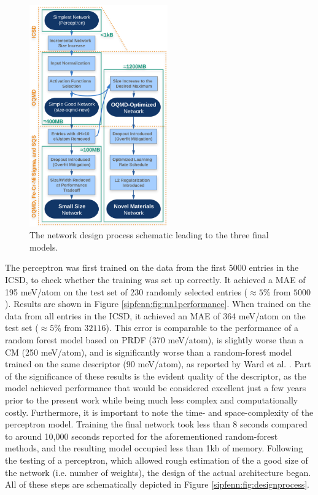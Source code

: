 \begin{figure}[H]
    \centering
    \includegraphics[width=0.53\textwidth]{sipfenn/SIPFENN_design_updated.png}
    \caption{The network design process schematic leading to the three final models.}
\end{figure}

The perceptron was first trained on the data from the first 5000 entries in the ICSD, to check whether the training was set up correctly. It achieved a MAE of 195 meV/atom on the test set of 230 randomly selected entries ($\approx 5\% \text{ from } 5000$). Results are shown in Figure \ref{sipfenn:fig:nn1performance}. When trained on the data from all entries in the ICSD, it achieved an MAE of 364 meV/atom on the test set ($\approx5\% \text{ from } 32116$). This error is comparable to the performance of a random forest model based on PRDF (370 meV/atom), is slightly worse than a CM (250 meV/atom), and is significantly worse than a random-forest model trained on the same descriptor (90 meV/atom), as reported by Ward et al. \cite{Ward2017IncludingTessellations}. Part of the significance of these results is the evident quality of the descriptor, as the model achieved performance that would be considered excellent just a few years prior to the present work while being much less complex and computationally costly. Furthermore, it is important to note the time- and space-complexity of the perceptron model. Training the final network took less than 8 seconds compared to around 10,000 seconds reported for the aforementioned random-forest methods, and the resulting model occupied less than 1kb of memory. Following the testing of a perceptron, which allowed rough estimation of the a good size of the network (i.e. number of weights), the design of the actual architecture began. All of these steps are schematically depicted in Figure \ref{sipfenn:fig:designprocess}.

